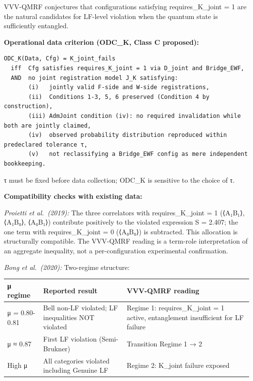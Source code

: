 \documentclass[
  11pt,
]{article}
\newcounter{none} %
\begin{document}
VVV-QMRF conjectures that configurations satisfying requires\_K\_joint =
1 are the natural candidates for LF-level violation when the quantum
state is sufficiently entangled.

\textbf{Operational data criterion (ODC\_K, Class C proposed):}

\begin{verbatim}
ODC_K(Data, Cfg) = K_joint_fails
  iff  Cfg satisfies requires_K_joint = 1 via D_joint and Bridge_EWF,
  AND  no joint registration model J_K satisfying:
       (i)   jointly valid F-side and W-side registrations,
       (ii)  Conditions 1-3, 5, 6 preserved (Condition 4 by construction),
       (iii) AdmJoint condition (iv): no required invalidation while both are jointly claimed,
       (iv)  observed probability distribution reproduced within predeclared tolerance τ,
       (v)   not reclassifying a Bridge_EWF config as mere independent bookkeeping.
\end{verbatim}

τ must be fixed before data collection; ODC\_K is sensitive to the
choice of τ.

\textbf{Compatibility checks with existing data:}

\emph{Proietti et al.~(2019):} The three correlators with
requires\_K\_joint = 1 (⟨A₁B₁⟩, ⟨A₁B₀⟩, ⟨A₀B₁⟩) contribute positively to
the violated expression S = 2.407; the one term with requires\_K\_joint
= 0 (⟨A₀B₀⟩) is subtracted. This allocation is structurally compatible.
The VVV-QMRF reading is a term-role interpretation of an aggregate
inequality, not a per-configuration experimental confirmation.

\emph{Bong et al.~(2020):} Two-regime structure:

{\def\LTcaptype{none} %
\begin{longtable}[]{@{}
  >{\raggedright\arraybackslash}p{}
  >{\raggedright\arraybackslash}p{}
  >{\raggedright\arraybackslash}p{}@{}}
\toprule\noalign{}
\begin{minipage}[b]{\linewidth}\raggedright
μ regime
\end{minipage} & \begin{minipage}[b]{\linewidth}\raggedright
Reported result
\end{minipage} & \begin{minipage}[b]{\linewidth}\raggedright
VVV-QMRF reading
\end{minipage} \\
\midrule\noalign{}
\endhead
\bottomrule\noalign{}
\endlastfoot
μ = 0.80-0.81 & Bell non-LF violated; LF inequalities NOT violated &
Regime 1: requires\_K\_joint = 1 active, entanglement insufficient for
LF failure \\
μ ≈ 0.87 & First LF violation (Semi-Brukner) & Transition Regime 1 →
2 \\
High μ & All categories violated including Genuine LF & Regime 2:
K\_joint failure exposed \\
\end{longtable}
}
\end{document}
